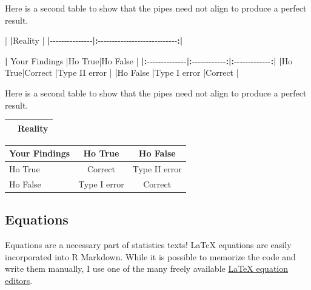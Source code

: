 \documentclass[
]{book}
\newenvironment{Shaded}{\begin{snugshade}}{\end{snugshade}}
\newcommand{\ErrorTok}[1]{\textcolor[rgb]{0.64,0.00,0.00}{\textbf{#1}}}
\newcommand{\NormalTok}[1]{#1}
\newcommand{\SpecialCharTok}[1]{\textcolor[rgb]{0.00,0.00,0.00}{#1}}
\begin{document}
\begin{Shaded}
\begin{Highlighting}[]
\NormalTok{Here is a second table to show that the pipes need not align to produce a perfect result.}

\SpecialCharTok{|}   \ErrorTok{|}\NormalTok{Reality }\SpecialCharTok{|}
\ErrorTok{|}\SpecialCharTok{{-}{-}{-}{-}{-}{-}{-}{-}{-}{-}{-}{-}{-}{-}{-}}\ErrorTok{|:}\SpecialCharTok{{-}{-}{-}{-}{-}{-}{-}{-}{-}{-}{-}{-}{-}{-}{-}{-}{-}{-}{-}{-}{-}{-}{-}{-}{-}{-}{-}{-}}\ErrorTok{:|}

\ErrorTok{|}\NormalTok{ Your Findings }\SpecialCharTok{|}\NormalTok{Ho True}\SpecialCharTok{|}\NormalTok{Ho False }\SpecialCharTok{|}
\ErrorTok{|:}\SpecialCharTok{{-}{-}{-}{-}{-}{-}{-}{-}{-}{-}{-}{-}{-}{-}}\ErrorTok{|:}\SpecialCharTok{{-}{-}{-}{-}{-}{-}{-}{-}{-}{-}{-}{-}}\ErrorTok{:|:}\SpecialCharTok{{-}{-}{-}{-}{-}{-}{-}{-}{-}{-}{-}{-}{-}}\ErrorTok{:|}
\ErrorTok{|}\NormalTok{Ho True}\SpecialCharTok{|}\NormalTok{Correct }\SpecialCharTok{|}\NormalTok{Type II error }\SpecialCharTok{|}
\ErrorTok{|}\NormalTok{Ho False }\SpecialCharTok{|}\NormalTok{Type I error }\SpecialCharTok{|}\NormalTok{Correct }\SpecialCharTok{|}
\end{Highlighting}
\end{Shaded}

Here is a second table to show that the pipes need not align to produce a perfect result.

\begin{longtable}[]{@{}lc@{}}
\toprule
& Reality \\
\midrule
\endhead
\bottomrule
\end{longtable}

\begin{longtable}[]{@{}lcc@{}}
\toprule
Your Findings & Ho True & Ho False \\
\midrule
\endhead
Ho True & Correct & Type II error \\
Ho False & Type I error & Correct \\
\bottomrule
\end{longtable}

\hypertarget{equations}{%
\subsection{Equations}\label{equations}}

Equations are a necessary part of statistics texts! LaTeX equations are easily incorporated into R Markdown. While it is possible to memorize the code and write them manually, I use one of the many freely available \href{https://www.codecogs.com/latex/eqneditor.php}{LaTeX equation editors}.
\end{document}
